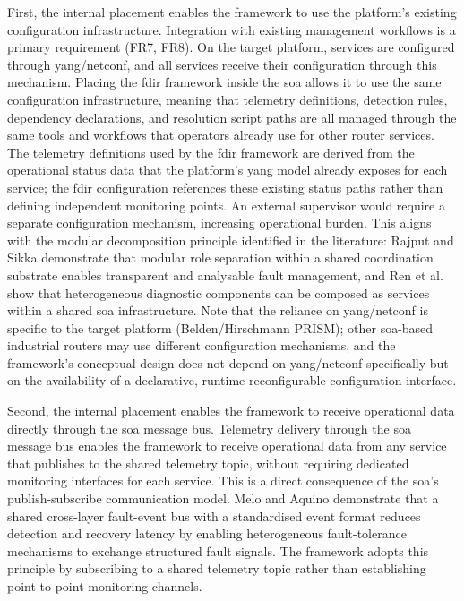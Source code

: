 First, the internal placement enables the framework to use the platform’s existing configuration infrastructure. Integration with existing management workflows is a primary requirement (FR7, FR8). On the target platform, services are configured through \gls{yang}/\gls{netconf}, and all services receive their configuration through this mechanism. Placing the \gls{fdir} framework inside the \gls{soa} allows it to use the same configuration infrastructure, meaning that telemetry definitions, detection rules, dependency declarations, and resolution script paths are all managed through the same tools and workflows that operators already use for other router services. The telemetry definitions used by the \gls{fdir} framework are derived from the operational status data that the platform’s \gls{yang} model already exposes for each service; the \gls{fdir} configuration references these existing status paths rather than defining independent monitoring points. An external supervisor would require a separate configuration mechanism, increasing operational burden. This aligns with the modular decomposition principle identified in the literature: Rajput and Sikka \cite{ref21} demonstrate that modular role separation within a shared coordination substrate enables transparent and analysable fault management, and Ren et al. \cite{ref29} show that heterogeneous diagnostic components can be composed as services within a shared \gls{soa} infrastructure. Note that the reliance on \gls{yang}/\gls{netconf} is specific to the target platform (Belden/Hirschmann PRISM); other \gls{soa}-based industrial routers may use different configuration mechanisms, and the framework’s conceptual design does not depend on \gls{yang}/\gls{netconf} specifically but on the availability of a declarative, runtime-reconfigurable configuration interface.

Second, the internal placement enables the framework to receive operational data directly through the \gls{soa} message bus. Telemetry delivery through the \gls{soa} message bus enables the framework to receive operational data from any service that publishes to the shared telemetry topic, without requiring dedicated monitoring interfaces for each service. This is a direct consequence of the \gls{soa}'s publish-subscribe communication model. Melo and Aquino \cite{ref15} demonstrate that a shared cross-layer fault-event bus with a standardised event format reduces detection and recovery latency by enabling heterogeneous fault-tolerance mechanisms to exchange structured fault signals. The framework adopts this principle by subscribing to a shared telemetry topic rather than establishing point-to-point monitoring channels.

